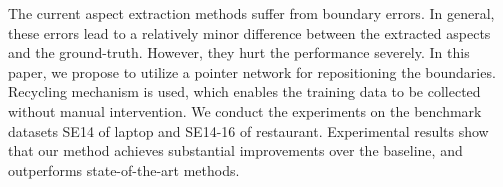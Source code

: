 The current aspect extraction methods suffer from boundary errors. In general, these errors lead to a relatively minor difference between the extracted aspects and the ground-truth.  However, they hurt the performance severely. In this paper, we propose to utilize a pointer network for repositioning the boundaries. Recycling mechanism is used, which enables the training data to be collected without manual intervention. We conduct the experiments on the benchmark datasets SE14 of laptop and SE14-16 of restaurant. Experimental results show that our method achieves substantial improvements over the baseline, and outperforms state-of-the-art methods.
